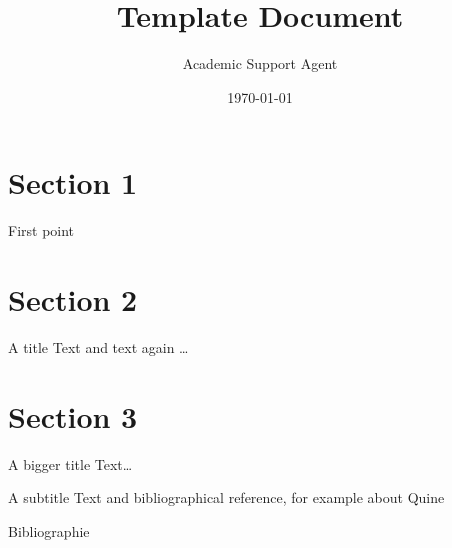 \documentclass{article}
\title{Template Document}
\author{Academic Support Agent}
\date{\today}
\begin{document}
\maketitle

\maketitle
%
\section{Section 1}
\label{sec:org0b3f57d}
\begin{frame}[label={sec:org61b7326}]{}
First point 
\end{frame}

\section{Section 2}
\label{sec:org39e5c65}
\begin{frame}[label={sec:org329bb0e}]{}
\begin{block}{A title}
Text and text again \ldots{} 
\end{block}
\end{frame}
\section{Section 3}
\label{sec:orga8cefef}
\begin{frame}[label={sec:org19156a6}]{A bigger title}
Text\ldots{}  \pause 
\begin{block}{A subtitle}
Text and bibliographical reference, for example about  Quine \cite{quine1934}
\end{block}
\end{frame}

\begin{frame}[label={sec:orge4f2952}]{Bibliographie}


\end{frame}
\end{document}
